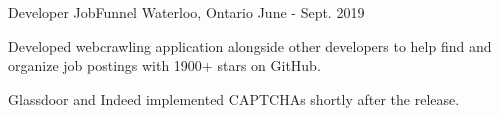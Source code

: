 \begin{cventries}

\cventry
  {Developer} %
  {JobFunnel} %
  {Waterloo, Ontario} %
  {June - Sept. 2019} %
  {
    \begin{cvitems} %
      \item {Developed webcrawling application alongside other developers to help find and organize job postings with 1900+ stars on GitHub.}
      \item {Glassdoor and Indeed implemented CAPTCHAs shortly after the release. }
    \end{cvitems}
  }


\end{cventries}
